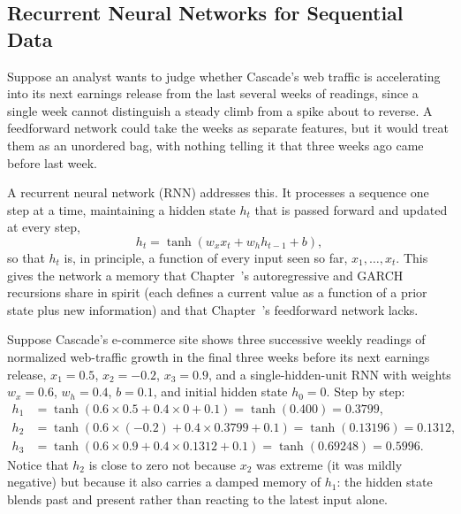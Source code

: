 \documentclass[../ai_in_finance]{subfiles}
\begin{document}
\subsection{Recurrent Neural Networks for Sequential Data}
\label{sec:rnn-sequential}

Suppose an analyst wants to judge whether Cascade's web traffic is accelerating into its next earnings release from the last several weeks of readings, since a single week cannot distinguish a steady climb from a spike about to reverse. A feedforward network could take the weeks as separate features, but it would treat them as an unordered bag, with nothing telling it that three weeks ago came before last week.

A recurrent neural network (RNN) addresses this. It processes a sequence one step at a time, maintaining a hidden state $h_t$ that is passed forward and updated at every step,
\begin{equation}
h_t = \tanh(w_x x_t + w_h h_{t-1} + b),
\label{eq:altdata-rnn}
\end{equation}
so that $h_t$ is, in principle, a function of every input seen so far, $x_1, \ldots, x_t$. This gives the network a memory that Chapter~'s autoregressive and GARCH recursions share in spirit (each defines a current value as a function of a prior state plus new information) and that Chapter~'s feedforward network lacks.

Suppose Cascade's e-commerce site shows three successive weekly readings of normalized web-traffic growth in the final three weeks before its next earnings release, $x_1 = 0.5$, $x_2 = -0.2$, $x_3 = 0.9$, and a single-hidden-unit RNN with weights $w_x = 0.6$, $w_h = 0.4$, $b = 0.1$, and initial hidden state $h_0 = 0$. Step by step:
\begin{align*}
h_1 &= \tanh(0.6 \times 0.5 + 0.4 \times 0 + 0.1) = \tanh(0.400) = 0.3799, \\
h_2 &= \tanh(0.6 \times (-0.2) + 0.4 \times 0.3799 + 0.1) = \tanh(0.13196) = 0.1312, \\
h_3 &= \tanh(0.6 \times 0.9 + 0.4 \times 0.1312 + 0.1) = \tanh(0.69248) = 0.5996.
\end{align*}
Notice that $h_2$ is close to zero not because $x_2$ was extreme (it was mildly negative) but because it also carries a damped memory of $h_1$: the hidden state blends past and present rather than reacting to the latest input alone.
\end{document}
